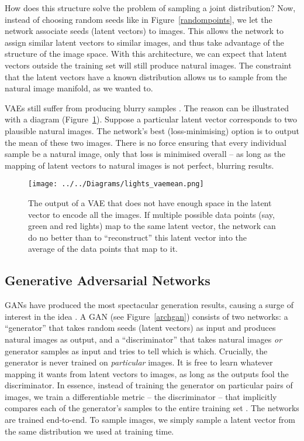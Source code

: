 \documentclass[11pt, a4paper, openany]{book}
\newcommand{\nquote}[1]{``{#1}''}
\begin{document}
How does this structure solve the problem of sampling a joint distribution? Now, instead of choosing random seeds like in Figure~\ref{randompoints}, we let the network associate seeds (latent vectors) to images. This allows the network to assign similar latent vectors to similar images, and thus take advantage of the structure of the image space. With this architecture, we can expect that latent vectors outside the training set will still produce natural images. The constraint that the latent vectors have a known distribution allows us to sample from the natural image manifold, as we wanted to.

VAEs still suffer from producing blurry samples \citep{vaeunderstanding}. The reason can be illustrated with a diagram (Figure~\ref{vaemean}). Suppose a particular latent vector corresponds to two plausible natural images. The network's best (loss-minimising) option is to output the mean of these two images. There is no force ensuring that every individual sample be a natural image, only that loss is minimised overall -- as long as the mapping of latent vectors to natural images is not perfect, blurring results.

\begin{figure}
  \centering
  \texttt{[image: ../../Diagrams/lights\_vaemean.png]}
  \caption[Output of a VAE]{The output of a VAE that does not have enough space in the latent vector to encode all the images. If multiple possible data points (say, green and red lights) map to the same latent vector, the network can do no better than to \nquote{reconstruct} this latent vector into the average of the data points that map to it.}
  \label{vaemean}
\end{figure}

\subsection{Generative Adversarial Networks}

GANs \citep{gan} have produced the most spectacular generation results, causing a surge of interest in the idea \citep{imagefromcaption,unsupervisedgan,structurestylegan,texttoimagegan,imagetoimagegan,progressivegrowing}. A GAN (see Figure~\ref{archgan}) consists of two networks: a \nquote{generator} that takes random seeds (latent vectors) as input and produces natural images as output, and a \nquote{discriminator} that takes natural images \emph{or} generator samples as input and tries to tell which is which. Crucially, the generator is never trained on \emph{particular} images. It is free to learn whatever mapping it wants from latent vectors to images, as long as the outputs fool the discriminator. In essence, instead of training the generator on particular pairs of images, we train a differentiable metric -- the discriminator -- that implicitly compares each of the generator's samples to the entire training set \citep{wgan}. The networks are trained end-to-end. To sample images, we simply sample a latent vector from the same distribution we used at training time.
\end{document}
